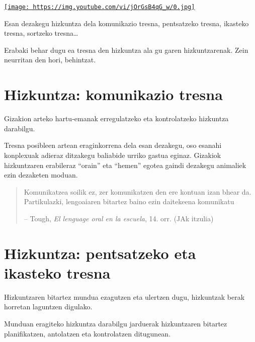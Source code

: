 \documentclass[
]{book}
\begin{document}
\href{http://www.youtube.com/watch?v=jOrGsB4qG_w}{\texttt{[image: https://img.youtube.com/vi/jOrGsB4qG\_w/0.jpg]}}

Esan dezakegu hizkuntza dela komunikazio tresna, pentsatzeko tresna, ikasteko tresna, sortzeko tresna\ldots{}

Erabaki behar dugu ea tresna den hizkuntza ala gu garen hizkuntzarenak. Zein neurritan den hori, behintzat.

\hypertarget{hizkuntza-komunikazio-tresna}{%
\section{Hizkuntza: komunikazio tresna}\label{hizkuntza-komunikazio-tresna}}

Gizakion arteko hartu-emanak erregulatzeko eta kontrolatzeko hizkuntza darabilgu.

Tresna posibleen artean eraginkorrena dela esan dezakegu, oso esanahi konplexuak adieraz ditzakegu baliabide urriko gastua eginaz. Gizakiok hizkuntzaren erabileraz ``orain'' eta ``hemen'' egotea gaindi dezakegu animaliek ezin dezaketen moduan.

\begin{quote}
Komunikatzea soilik ez, zer komunikatzen den ere kontuan izan bhear da. Partikulazki, lengoaiaren bitartez baino ezin daitekeena komunikatu

-- Tough, \emph{El lenguage oral en la escuela}, 14. orr. (JAk itzulia)
\end{quote}

\hypertarget{hizkuntza-pentsatzeko-eta-ikasteko-tresna}{%
\section{Hizkuntza: pentsatzeko eta ikasteko tresna}\label{hizkuntza-pentsatzeko-eta-ikasteko-tresna}}

Hizkuntzaren bitartez mundua ezagutzen eta ulertzen dugu, hizkuntzak berak horretan laguntzen digulako.

Munduan eragiteko hizkuntza darabilgu jarduerak hizkuntzaren bitartez planifikatzen, antolatzen eta kontrolatzen ditugunean.
\end{document}
